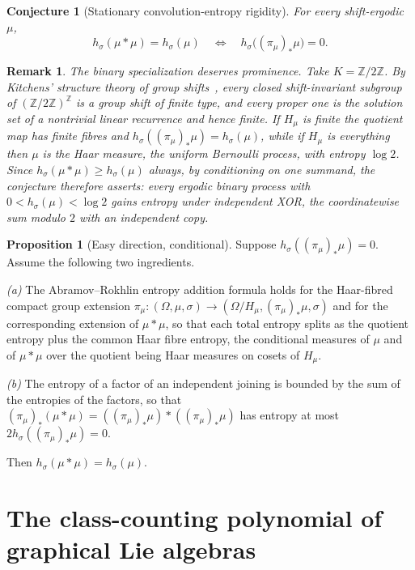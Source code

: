 \documentclass[11pt]{article}
\newtheorem{conjecture}{Conjecture}
\newtheorem{remark}{Remark}
\theoremstyle{definition}
\newcommand{\Z}{\mathbb Z}
\providecommand{\Z}{\mathbb Z}
\newtheorem{proposition}{Proposition}
\begin{document}
\begin{conjecture}[Stationary convolution-entropy rigidity]\label{t6}
For every shift-ergodic $\mu$,
\[
h_\sigma(\mu*\mu)=h_\sigma(\mu)
\quad\Longleftrightarrow\quad
h_\sigma\bigl((\pi_\mu)_*\mu\bigr)=0 .
\]
\end{conjecture}

\begin{remark}\label{t6:binary}
The binary specialization deserves prominence.  Take $K=\Z/2\Z$.  By
Kitchens' structure theory of group shifts~\cite{Kit87}, every closed
shift-invariant subgroup of $(\Z/2\Z)^{\Z}$ is a group shift of finite
type, and every proper one is the solution set of a nontrivial linear
recurrence and hence finite.  If $H_\mu$ is finite the quotient map
has finite fibres and $h_\sigma((\pi_\mu)_*\mu)=h_\sigma(\mu)$, while
if $H_\mu$ is everything then $\mu$ is the Haar measure, the uniform
Bernoulli process, with entropy $\log2$.  Since
$h_\sigma(\mu*\mu)\ge h_\sigma(\mu)$ always, by conditioning on one
summand, the conjecture therefore asserts: every ergodic binary
process with $0<h_\sigma(\mu)<\log2$ gains entropy under independent
XOR, the coordinatewise sum modulo $2$ with an independent copy.
\end{remark}

\begin{proposition}[Easy direction, conditional]\label{t6:easy}
Suppose $h_\sigma((\pi_\mu)_*\mu)=0$.  Assume the following two
ingredients.

\emph{(a)} The Abramov--Rokhlin entropy addition formula holds for the
Haar-fibred compact group extension $\pi_\mu:(\Omega,\mu,\sigma)\to(\Omega/H_\mu,(\pi_\mu)_*\mu,\sigma)$ and for the
corresponding extension of $\mu*\mu$, so that each total entropy
splits as the quotient entropy plus the common Haar fibre entropy,
the conditional measures of $\mu$ and of $\mu*\mu$ over the quotient
being Haar measures on cosets of $H_\mu$.

\emph{(b)} The entropy of a factor of an independent joining is
bounded by the sum of the entropies of the factors, so that
$(\pi_\mu)_*(\mu*\mu)=((\pi_\mu)_*\mu)*((\pi_\mu)_*\mu)$ has entropy
at most $2h_\sigma((\pi_\mu)_*\mu)=0$.

Then $h_\sigma(\mu*\mu)=h_\sigma(\mu)$.
\end{proposition}



\part{The class-counting polynomial of graphical Lie algebras}
\end{document}
